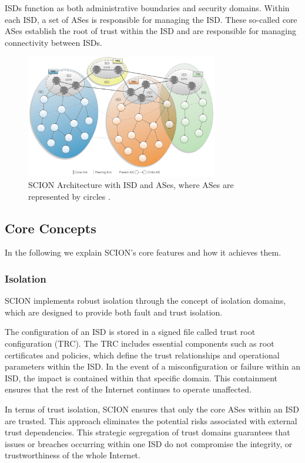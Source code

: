 ISDs function as both administrative boundaries and security domains.
Within each ISD, a set of ASes is responsible for managing the ISD.
These so-called core ASes establish the root of trust within the ISD and are responsible for managing connectivity between ISDs.

\begin{figure}[h]
    \centering
    \includegraphics[width=0.75\textwidth]{figures/scion_isd_architecture.png}
    \caption{SCION Architecture with ISD and ASes, where ASes are represented by circles \cite[Chapter 2]{Perrig2022}.}
    \label{fig:scion_isd_architecture}
\end{figure}

\newpage
\subsection{Core Concepts}
In the following we explain SCION's core features and how it achieves them.
\subsubsection{Isolation}

SCION implements robust isolation through the concept of isolation domains, which are designed to provide both fault and trust isolation.

The configuration of an ISD is stored in a signed file called trust root configuration (TRC).
The TRC includes essential components such as root certificates and policies, which define the trust relationships and operational parameters within the ISD.
In the event of a misconfiguration or failure within an ISD, the impact is contained within that specific domain.
This containment ensures that the rest of the Internet continues to operate unaffected.

In terms of trust isolation, SCION ensures that only the core ASes within an ISD are trusted.
This approach eliminates the potential risks associated with external trust dependencies.
This strategic segregation of trust domains guarantees that issues or breaches occurring within one ISD do not compromise the integrity, or trustworthiness of the whole Internet.


